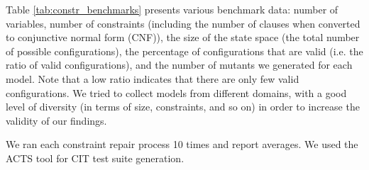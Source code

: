 \begin{tikzborder}{\cite{Gargantini16:validation}}
\begin{tikzborder}{\cite{gargantini_combinatorial_2017}}
\begin{tikzborder}{\cite{gargantini_combinatorial_2017}}
\begin{table}[h]
	\caption{The benchmark data {\small (for CNF size $a^b$ means $b$ clauses with $a$ literals each.)}}\label{tab:constr_benchmarks}
	\small \centering
\end{table}

\smallskip

Table \ref{tab:constr_benchmarks} presents various benchmark data: number of variables, number of constraints (including the number of clauses when converted to conjunctive normal form (CNF)), the size of the state space (the total number of possible configurations), the percentage of configurations that are valid  (i.e. the ratio of valid configurations), and the number of mutants we generated for each model. Note that a low ratio indicates that there are only few valid configurations. We tried to collect models from different domains, with a good level of diversity (in terms of size, constraints, and so on) in order to increase the validity of our findings.

We ran each constraint repair process 10 times and report averages. We used the ACTS tool for CIT test suite generation.



\end{tikzborder}
\end{tikzborder}
\end{tikzborder}
